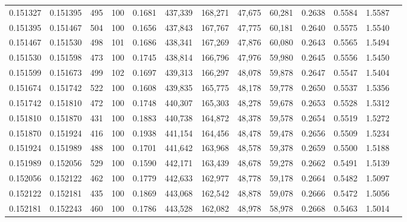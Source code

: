 \begin{tabular}{rrrrrrrrrrrrr}
0.151327 & 0.151395 &   495 & 100 &                                     0.1681 & 437,339 & 168,271 &  47,675 &  60,281 & 0.2638 & 0.5584 & 1.5587 \\
0.151395 & 0.151467 &   504 & 100 &                                     0.1656 & 437,843 & 167,767 &  47,775 &  60,181 & 0.2640 & 0.5575 & 1.5540 \\
0.151467 & 0.151530 &   498 & 101 &                                     0.1686 & 438,341 & 167,269 &  47,876 &  60,080 & 0.2643 & 0.5565 & 1.5494 \\
0.151530 & 0.151598 &   473 & 100 &                                     0.1745 & 438,814 & 166,796 &  47,976 &  59,980 & 0.2645 & 0.5556 & 1.5450 \\
0.151599 & 0.151673 &   499 & 102 &                                     0.1697 & 439,313 & 166,297 &  48,078 &  59,878 & 0.2647 & 0.5547 & 1.5404 \\
0.151674 & 0.151742 &   522 & 100 &                                     0.1608 & 439,835 & 165,775 &  48,178 &  59,778 & 0.2650 & 0.5537 & 1.5356 \\
0.151742 & 0.151810 &   472 & 100 &                                     0.1748 & 440,307 & 165,303 &  48,278 &  59,678 & 0.2653 & 0.5528 & 1.5312 \\
0.151810 & 0.151870 &   431 & 100 &                                     0.1883 & 440,738 & 164,872 &  48,378 &  59,578 & 0.2654 & 0.5519 & 1.5272 \\
0.151870 & 0.151924 &   416 & 100 &                                     0.1938 & 441,154 & 164,456 &  48,478 &  59,478 & 0.2656 & 0.5509 & 1.5234 \\
0.151924 & 0.151989 &   488 & 100 &                                     0.1701 & 441,642 & 163,968 &  48,578 &  59,378 & 0.2659 & 0.5500 & 1.5188 \\
0.151989 & 0.152056 &   529 & 100 &                                     0.1590 & 442,171 & 163,439 &  48,678 &  59,278 & 0.2662 & 0.5491 & 1.5139 \\
0.152056 & 0.152122 &   462 & 100 &                                     0.1779 & 442,633 & 162,977 &  48,778 &  59,178 & 0.2664 & 0.5482 & 1.5097 \\
0.152122 & 0.152181 &   435 & 100 &                                     0.1869 & 443,068 & 162,542 &  48,878 &  59,078 & 0.2666 & 0.5472 & 1.5056 \\
0.152181 & 0.152243 &   460 & 100 &                                     0.1786 & 443,528 & 162,082 &  48,978 &  58,978 & 0.2668 & 0.5463 & 1.5014 \\

\end{tabular}
